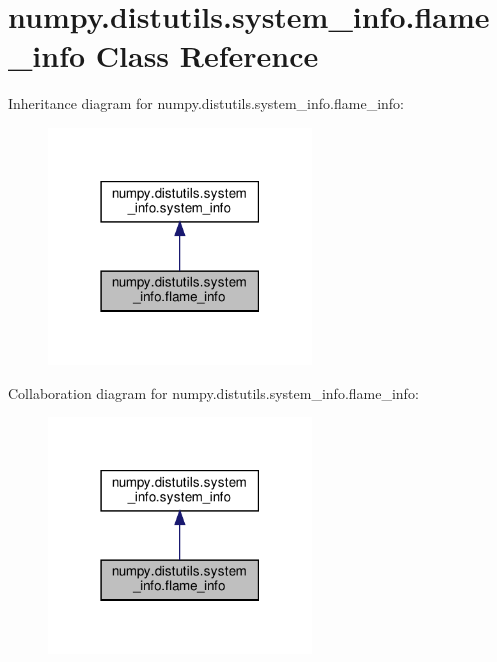 \hypertarget{classnumpy_1_1distutils_1_1system__info_1_1flame__info}{}\section{numpy.\+distutils.\+system\+\_\+info.\+flame\+\_\+info Class Reference}
\label{classnumpy_1_1distutils_1_1system__info_1_1flame__info}


Inheritance diagram for numpy.\+distutils.\+system\+\_\+info.\+flame\+\_\+info\+:
\nopagebreak
\begin{figure}[H]
\begin{center}
\leavevmode
\includegraphics[width=198pt]{classnumpy_1_1distutils_1_1system__info_1_1flame__info__inherit__graph}
\end{center}
\end{figure}


Collaboration diagram for numpy.\+distutils.\+system\+\_\+info.\+flame\+\_\+info\+:
\nopagebreak
\begin{figure}[H]
\begin{center}
\leavevmode
\includegraphics[width=198pt]{classnumpy_1_1distutils_1_1system__info_1_1flame__info__coll__graph}
\end{center}
\end{figure}
